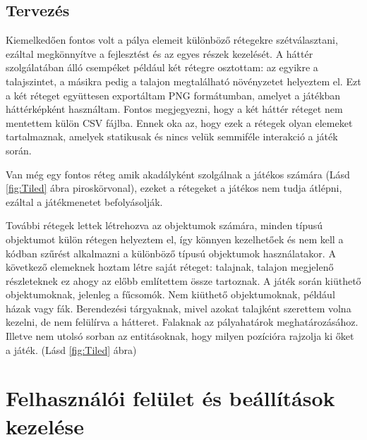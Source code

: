 \subsection{Tervezés} \label{subsec:Tervezés}

\indent \indent Kiemelkedően fontos volt a pálya elemeit különböző rétegekre szétválasztani, ezáltal megkönnyítve a fejlesztést és az egyes részek kezelését. A háttér szolgálatában álló csempéket például két rétegre osztottam: az egyikre a talajszintet, a másikra pedig a talajon megtalálható növényzetet helyeztem el. Ezt a két réteget együttesen exportáltam PNG formátumban, amelyet a játékban háttérképként használtam. Fontos megjegyezni, hogy a két háttér réteget nem mentettem külön CSV fájlba. Ennek oka az, hogy ezek a rétegek olyan elemeket tartalmaznak, amelyek statikusak és nincs velük semmiféle interakció a játék során. 

Van még egy fontos réteg amik akadályként szolgálnak a játékos számára (Lásd \ref{fig:Tiled} ábra piroskörvonal), ezeket a rétegeket a játékos nem tudja átlépni, ezáltal a játékmenetet befolyásolják.  

További rétegek lettek létrehozva az objektumok számára, minden típusú objektumot külön rétegen helyeztem el, így könnyen kezelhetőek és nem kell a kódban szűrést alkalmazni a különböző típusú objektumok használatakor.
A következő elemeknek hoztam létre saját réteget: talajnak, talajon megjelenő részleteknek ez ahogy az előbb említettem össze tartoznak. A játék során kiüthető objektumoknak, jelenleg a fűcsomók. Nem kiüthető objektumoknak, például házak vagy fák. Berendezési tárgyaknak, mivel azokat talajként szerettem volna kezelni, de nem felülírva a hátteret. Falaknak az pályahatárok meghatározásához. Illetve nem utolsó sorban az entitásoknak, hogy milyen pozícióra rajzolja ki őket a játék.  (Lásd \ref{fig:Tiled} ábra)



\section{Felhasználói felület és beállítások kezelése}

